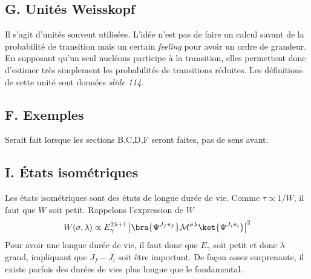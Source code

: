 \subsection{G. Unités Weisskopf}
Il s'agit d'unités souvent utilisées. L'idée n'est pas de faire un calcul savant de la probabilité de transition
mais un certain \textit{feeling} pour avoir un ordre de grandeur. En supposant qu'un seul nucléons participe à
la transition, elles permettent donc d'estimer très simplement les probabilités de transitions réduites. Les
définitions de cette unité sont données \textit{slide 114}.

\subsection{F. Exemples}
Serait fait lorsque les sections \textsc{B,C,D,F} seront faites, pas de sens avant.





\subsection{I. États isométriques}
Les états isométriques sont des états de longue durée de vie. Comme $\tau\propto 1/W$, il faut que
$W$ soit petit. Rappelons l'expression de $W$
\begin{equation}
W(\sigma,\lambda) \propto E_\gamma^{2\lambda+1}\left|\bra{\Psi^{J_f\pi_f}}\mathcal{M}^{\sigma\lambda}\ket{
\Psi^{J_i\pi_i}}\right|^2
\end{equation}
Pour avoir une longue durée de vie, il faut donc que $E_\gamma$ soit petit et donc $\lambda$ grand, impliquant
que $J_f-J_i$ soit être important. De façon assez surprenante, il existe parfois des durées de vies plus 
longue que le fondamental.

